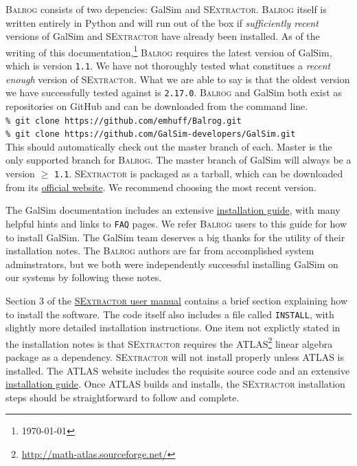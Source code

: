 \documentclass[12pt]{book}
\newcommand{\py}{Python}
\newcommand{\galsim}{GalSim}
\newcommand{\balrog}{\textsc{Balrog}}
\newcommand{\sex}{\textsc{SExtractor}}
\newcommand{\inline}{\\[0.4cm]}
\newcommand{\ericdate}{\mydate\today}
\begin{document}
\balrog{} consists of two depencies: \galsim{} and \sex{}.
\balrog{} itself is written entirely in \py{} and will run out of the box if  
\emph{sufficiently recent} versions of \galsim{} and \sex{} have already been installed.
As of the writing of this documentation,\footnote{\label{foot:date}\ericdate} 
\balrog{} requires the latest version of \galsim{}, which is version \texttt{1.1}.
We have not thoroughly tested what constitues a \emph{recent enough} version of \sex{}.
What we are able to say is that the oldest version we have successfully tested against is \texttt{2.17.0}.
\balrog{} and \galsim{} both exist as repositories on GitHub and can be downloaded 
from the command line.
\inline
\texttt{\% git clone https://github.com/emhuff/Balrog.git} \\
\texttt{\% git clone https://github.com/GalSim-developers/GalSim.git}
\inline
This should automatically check out the master branch of each.
Master is the only supported branch for \balrog{}. 
The master branch of \galsim{} will always be a version $\geq$ \texttt{1.1}.
\sex{} is packaged as a tarball, which can be downloaded 
from its \href{https://www.astromatic.net/software/sextractor}{official website}.
We recommend choosing the most recent version.

The \galsim{} documentation includes an extensive
\href{https://github.com/GalSim-developers/GalSim/blob/releases/1.0/INSTALL.md}{installation guide},
with many helpful hints and links to \texttt{FAQ} pages. 
We refer \balrog{} users to this guide for how to install \galsim{}.
The \galsim{} team deserves a big thanks for the utility of their installation notes.
The \balrog{} authors are far from accomplished system adminstrators, 
but we both were independently successful installing \galsim{} on our systems by following these notes.

Section 3 of the \href{https://www.astromatic.net/pubsvn/software/sextractor/trunk/doc/sextractor.pdf}{\sex{} user manual}
contains a brief section explaining how to install the software. The code itself also includes a file called \texttt{INSTALL}, with
slightly more detailed installation instructions.
One item not explictly stated in the installation notes is that \sex{} requires the ATLAS\footnote{\url{http://math-atlas.sourceforge.net/}}
linear algebra package as a dependency.
\sex{} will not install properly unless ATLAS is installed. 
The ATLAS website includes the requisite source code and
an extensive \href{http://math-atlas.sourceforge.net/atlas_install/}{installation guide}.
Once ATLAS builds and installs, the \sex{} installation steps should be straightforward to follow and complete.
\end{document}
